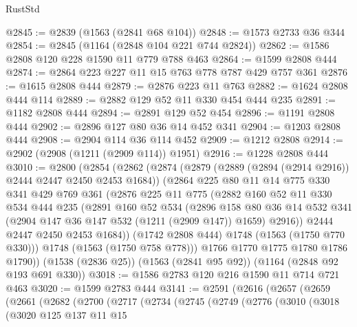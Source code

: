 \begin{lexlean}{RustStd}
\begin{coremodule}
{\begin{coremodule}
{{{{{{{{@2845 := @2839 (@1563 (@2841 @68 @104))
@2848 := @1573 @2733 @36 @344
@2854 := @2845 (@1164 (@2848 @104 @221 @744 @2824))
@2862 := @1586 @2808 @120 @228 @1590 @11 @779 @788 @463
@2864 := @1599 @2808 @444
@2874 := @2864 @223 @227 @11 @15 @763 @778 @787 @429 @757 @361
@2876 := @1615 @2808 @444
@2879 := @2876 @223 @11 @763
@2882 := @1624 @2808 @444 @114
@2889 := @2882 @129 @52 @11 @330 @454 @444 @235
@2891 := @1182 @2808 @444
@2894 := @2891 @129 @52 @454
@2896 := @1191 @2808 @444
@2902 := @2896 @127 @80 @36 @14 @452 @341
@2904 := @1203 @2808 @444
@2908 := @2904 @114 @36 @114 @452
@2909 := @1212 @2808
@2914 := @2902 (@2908 (@1211 (@2909 @114)) @1951)
@2916 := @1228 @2808 @444
@3010 := @2800
    (@2854
      (@2862
        (@2874
          (@2879 (@2889 (@2894 (@2914 @2916)) @2444 @2447 @2450 @2453 @1684))
          (@2864
            @225
            @80
            @11
            @14
            @775
            @330
            @341
            @429
            @769
            @361
            (@2876
              @225
              @11
              @775
              (@2882
                @160
                @52
                @11
                @330
                @534
                @444
                @235
                (@2891
                  @160
                  @52
                  @534
                  (@2896
                    @158
                    @80
                    @36
                    @14
                    @532
                    @341
                    (@2904 @147 @36 @147 @532 (@1211 (@2909 @147)) @1659)
                    @2916))
                @2444
                @2447
                @2450
                @2453
                @1684))
            (@1742 @2808 @444)
            @1748
            (@1563 (@1750 @770 @330)))
          @1748
          (@1563 (@1750 @758 @778)))
        @1766
        @1770
        @1775
        @1780
        @1786
        @1790))
    (@1538 (@2836 @25))
    (@1563 (@2841 @95 @92))
    (@1164 (@2848 @92 @193 @691 @330))
@3018 := @1586 @2783 @120 @216 @1590 @11 @714 @721 @463
@3020 := @1599 @2783 @444
@3141 := @2591
    (@2616
      (@2657
        (@2659
          (@2661
            (@2682
              (@2700
                (@2717
                  (@2734
                    (@2745
                      (@2749
                        (@2776
                          (@3010
                            (@3018
                              (@3020
                                @125
                                @137
                                @11
                                @15
}}}}}}}}
\end{coremodule}}
\end{coremodule}
\end{lexlean}
